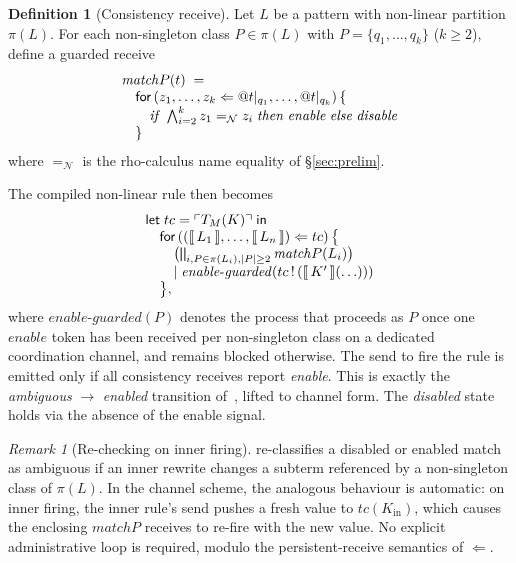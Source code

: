 \documentclass[11pt]{article}
\theoremstyle{plain}
\theoremstyle{definition}
\newtheorem{definition}[theorem]{Definition}
\theoremstyle{remark}
\newtheorem{remark}[theorem]{Remark}
\newcommand{\sem}[1]{\llbracket\,#1\,\rrbracket}
\newcommand{\reflect}[1]{\ulcorner #1 \urcorner}
\newcommand{\Match}{\mathit{match}}
\newcommand{\Send}[2]{#1 \,!\, (#2)}
\begin{document}
\begin{definition}[Consistency receive]\label{def:consistency}
Let $L$ be a pattern with non-linear partition $\pi(L)$. For each
non-singleton class $P \in \pi(L)$ with $P = \{q_{1}, \ldots, q_{k}\}$
($k \ge 2$), define a guarded receive
\[
\begin{array}{@{}l@{}}
  \Match{P}(t) \;=\; \\
  \quad \mathsf{for}\,(z_{1}, \ldots, z_{k} \Leftarrow @t|_{q_{1}}, \ldots, @t|_{q_{k}})\,\{ \\
  \quad\quad \mathit{if}\;\bigwedge_{i=2}^{k} z_{1} =_{\mathcal{N}} z_{i}\;\mathit{then}\;\mathit{enable}\;\mathit{else}\;\mathit{disable} \\
  \quad \}
\end{array}
\]
where $=_{\mathcal{N}}$ is the rho-calculus name equality of
\S\ref{sec:prelim}.
\end{definition}

The compiled non-linear rule then becomes
\[
\begin{array}{@{}l@{}}
  \mathsf{let}\;tc = \reflect{T_{M}(K)}\;\mathsf{in} \\
  \quad \mathsf{for}\,((\sem{L_{1}}, \ldots, \sem{L_{n}}) \Leftarrow tc)\,\bigl\{ \\
  \quad\quad \bigl(\bigparallel_{i, P \in \pi(L_{i}), |P| \ge 2} \Match{P}(L_{i})\bigr) \\
  \quad\quad \mid \mathit{enable\text{-}guarded}(\Send{tc}{\sem{K'}(\ldots)}) \\
  \quad \bigr\},
\end{array}
\]
where $\mathit{enable\text{-}guarded}(P)$ denotes the process that
proceeds as $P$ once one $\mathit{enable}$ token has been received per
non-singleton class on a dedicated coordination channel, and remains
blocked otherwise. The send to fire the rule is emitted only if all
consistency receives report \emph{enable}. This is exactly the
\textit{ambiguous} $\to$ \textit{enabled} transition
of~\cite[Algorithm~2, lines 12--17]{BouwmanErkens2022}, lifted to
channel form. The \textit{disabled} state holds via the absence of the
enable signal.

\begin{remark}[Re-checking on inner firing]\label{rem:recheck}
\cite[Algorithm~2, lines 24--31]{BouwmanErkens2022} re-classifies a
disabled or enabled match as ambiguous if an inner rewrite changes a
subterm referenced by a non-singleton class of $\pi(L)$. In the channel
scheme, the analogous behaviour is automatic: on inner firing, the inner
rule's send pushes a fresh value to $tc(K_{\mathrm{in}})$, which causes
the enclosing $\Match{P}$ receives to re-fire with the new value. No
explicit administrative loop is required, modulo the persistent-receive
semantics of $\Leftarrow$.
\end{remark}
\end{document}
